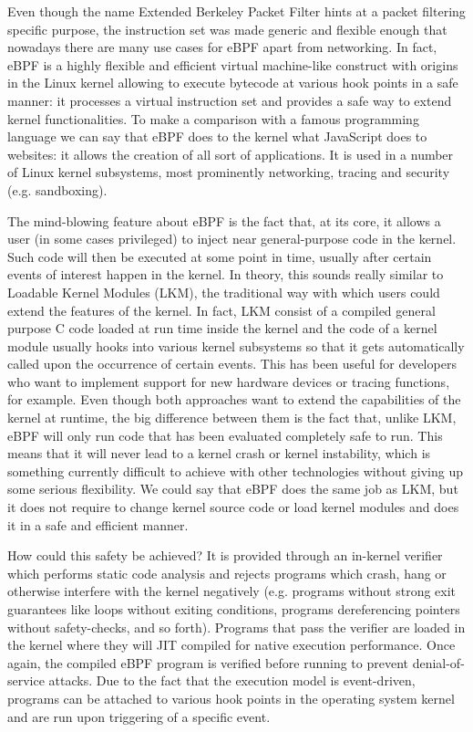 Even though the name Extended Berkeley Packet Filter hints at a packet filtering specific purpose, the instruction set was made generic and flexible enough that nowadays there are many use cases for eBPF apart from networking. 
In fact, eBPF is a highly flexible and efficient virtual machine-like construct with origins in the Linux kernel allowing to execute bytecode at various hook points in a safe manner: it processes a virtual instruction set and provides a safe way to extend kernel functionalities.
To make a comparison with a famous programming language we can say that eBPF does to the kernel what JavaScript does to websites: it allows the creation of all sort of applications.
It is used in a number of Linux kernel subsystems, most prominently networking, tracing and security (e.g. sandboxing).

The mind-blowing feature about eBPF is the fact that, at its core, it allows a user (in some cases privileged) to inject near general-purpose code in the kernel. 
Such code will then be executed at some point in time, usually after certain events of interest happen in the kernel. 
In theory, this sounds really similar to Loadable Kernel Modules (LKM), the traditional way with which users could extend the features of the kernel.
In fact, LKM consist of a compiled general purpose C code loaded at run time inside the kernel and the code of a kernel module usually hooks into various kernel subsystems so that it gets automatically called upon the occurrence of certain events.
This has been useful for developers who want to implement support for new hardware devices or tracing functions, for example.
Even though both approaches want to extend the capabilities of the kernel at runtime, the big difference between them is the fact that, unlike LKM, eBPF will only run code that has been evaluated completely safe to run.
This means that it will never lead to a kernel crash or kernel instability, which is something currently difficult to achieve with other technologies without giving up some serious flexibility. 
We could say that eBPF does the same job as LKM, but it does not require to change kernel source code or load kernel modules and does it in a safe and efficient manner.

How could this safety be achieved? It is provided through an in-kernel verifier which performs static code analysis and rejects programs which crash, hang or otherwise interfere with the kernel negatively (e.g. programs without strong exit guarantees like loops without exiting conditions, programs dereferencing pointers without safety-checks, and so forth).
Programs that pass the verifier are loaded in the kernel where they will JIT compiled for native execution performance.
Once again, the compiled eBPF program is verified before running to prevent denial-of-service attacks.
Due to the fact that the execution model is event-driven, programs can be attached to various hook points in the operating system kernel and are run upon triggering of a specific event.

